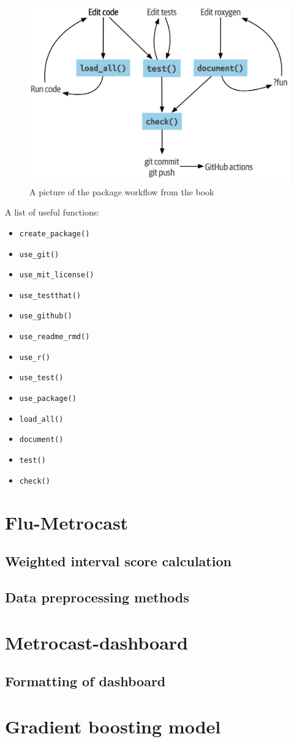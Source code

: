 \documentclass[12pt]{article}
\begin{document}
\begin{figure}
    \centering
    \includegraphics[width=0.8\linewidth]{workflow.png}
    \caption{A picture of the package workflow from the book}
\end{figure}

\pagebreak

A list of useful functions:
\begin{itemize}
    \item \verb|create_package()|
    \item \verb|use_git()|
    \item \verb|use_mit_license()|
    \item \verb|use_testthat()|
    \item \verb|use_github()|
    \item \verb|use_readme_rmd()|
    \item \verb|use_r()|
    \item \verb|use_test()|
    \item \verb|use_package()|
    \item \verb|load_all()|
    \item \verb|document()|
    \item \verb|test()|
    \item \verb|check()|
\end{itemize}


\section{Flu-Metrocast}
\subsection{Weighted interval score calculation}
\subsection{Data preprocessing methods}
\section{Metrocast-dashboard}
\subsection{Formatting of dashboard}
\section{Gradient boosting model}
\end{document}
